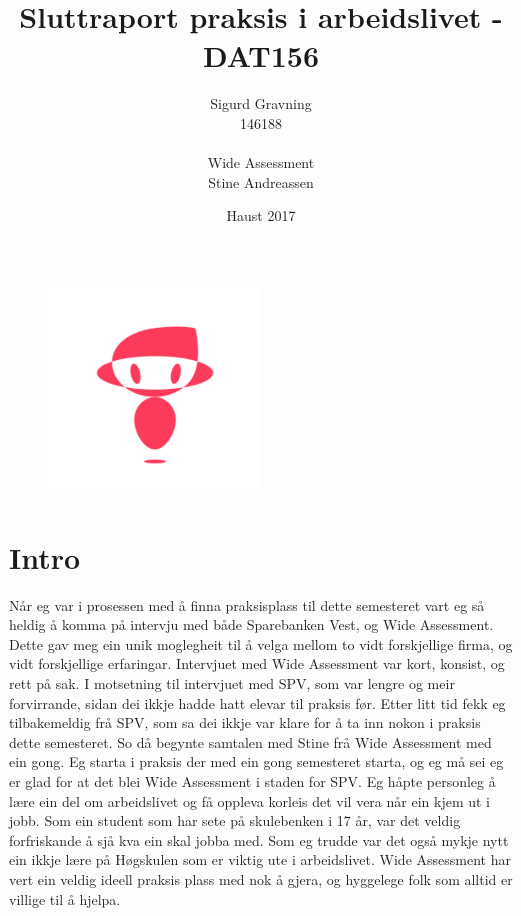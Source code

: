 \documentclass[12pt]{article}
\title{Sluttraport praksis i arbeidslivet - DAT156}
\date{Haust 2017}
\author{Sigurd Gravning \\146188 \\ \\Wide Assessment \\Stine Andreassen}
\begin{document}
\maketitle

\begin{figure}[!h]
  \includegraphics[width=0.5\textwidth]{WA}
  \centering
\end{figure}

\newpage
{}
\tableofcontents
\newpage

\section{Intro}

Når eg var i prosessen med å finna praksisplass til dette semesteret vart eg så
heldig å komma på intervju med både Sparebanken Vest, og Wide Assessment.
Dette gav meg ein unik moglegheit til å velga mellom to vidt forskjellige firma,
og vidt forskjellige erfaringar. Intervjuet med Wide Assessment var kort, konsist,
og rett på sak. I motsetning til intervjuet med SPV, som var lengre og meir forvirrande,
sidan dei ikkje hadde hatt elevar til praksis før. Etter litt tid fekk eg
tilbakemeldig frå SPV, som sa dei ikkje var klare for å ta inn nokon i praksis
dette semesteret. So då begynte samtalen med Stine frå Wide Assessment med ein gong.
Eg starta  i praksis der med ein gong semesteret starta, og eg må sei eg er glad
for at det blei Wide Assessment i staden for SPV. Eg håpte personleg å lære ein
del om arbeidslivet og få oppleva korleis det vil vera når ein kjem ut i jobb.
Som ein student som har sete på skulebenken i 17 år, var det veldig forfriskande
å sjå kva ein skal jobba med. Som eg trudde var det også mykje nytt ein ikkje
lære på Høgskulen som er viktig ute i arbeidslivet. Wide Assessment har vert
ein veldig ideell praksis plass med nok å gjera, og hyggelege folk som alltid
er villige til å hjelpa.
\end{document}
